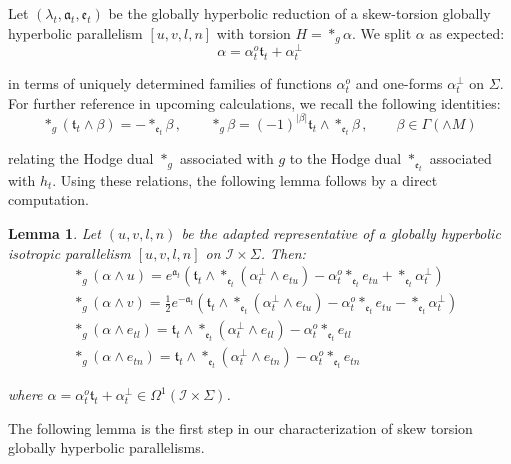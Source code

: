 \documentclass[10pt,reqno,a4paper]{amsart}
\theoremstyle{plain}
\newtheorem{lemma}[thm]{Lemma}
\theoremstyle{definition}
\theoremstyle{remark}
\theoremstyle{remark}
\newcommand{\frt}{\mathfrak{t}}
\def\cI{\mathcal{I}}
\def\fra{\mathfrak{a}}
\def\fre{\mathfrak{e}}
\renewcommand{\(}{ (}
\renewcommand{\)}{ )}
\begin{document}
\noindent
Let $(\lambda_t,\fra_t,\fre_t)$ be the globally hyperbolic reduction of a skew-torsion globally hyperbolic parallelism $[u,v,l,n]$ with torsion $H = \ast_g \alpha$. We split $\alpha$ as expected:
\begin{equation}
\label{eq:splittingxialpha}
\alpha = \alpha_t^o \frt_t +  \alpha^{\perp}_t
\end{equation}

\noindent
in terms of uniquely determined families of functions $\alpha_t^o$ and one-forms $\alpha^{\perp}_t$ on $\Sigma$. For further reference in upcoming calculations, we recall the following identities:
\begin{equation}
\label{eq:hodgehyperbolic}
\ast_g(\frt_t \wedge \beta) = -\ast_{\fre_t}\beta\, , \qquad \ast_{g}\beta = (-1)^{\vert\beta \vert} \frt_t \wedge \ast_{\fre_t} \beta\, , \qquad \beta \in \Gamma(\wedge M) 
\end{equation}

\noindent
relating the Hodge dual $\ast_g$ associated with $g$ to the Hodge dual $\ast_{\fre_t}$ associated with $h_t$. Using these relations, the following lemma follows by a direct computation.


\begin{lemma}
\label{lemma:dualphasplitting}
Let $(u,v,l,n)$ be the adapted representative of a globally hyperbolic
isotropic parallelism $[u,v,l,n]$ on $\cI\times\Sigma$. Then:
\begin{eqnarray*}
& \ast_g(\alpha\wedge u) = e^{\fra_t}  (\frt_t \wedge \ast_{\fre_t}(\alpha^{\perp}_t \wedge e_{tu})  - \alpha^o_t \ast_{\fre_t} e_{tu} + \ast_{\fre_t}\alpha^{\perp}_t) \\
& \ast_g(\alpha\wedge v) = \frac{1}{2} e^{-\fra_t} (\frt_t \wedge \ast_{\fre_t}(\alpha^{\perp}_t \wedge e_{tu})  - \alpha^o_t \ast_{\fre_t} e_{tu} - \ast_{\fre_t}\alpha^{\perp}_t) \\
& \ast_g(\alpha\wedge e_{tl}) =  \frt_t \wedge \ast_{\fre_t}(\alpha^{\perp}_t \wedge e_{tl})  - \alpha^o_t \ast_{\fre_t} e_{tl} \\
& \ast_g(\alpha\wedge e_{tn}) =  \frt_t \wedge \ast_{\fre_t}(\alpha^{\perp}_t \wedge e_{tn})  - \alpha^o_t \ast_{\fre_t} e_{tn} 
\end{eqnarray*}

\noindent
where $\alpha = \alpha^o_t \frt_t + \alpha^{\perp}_t \in \Omega^1(\cI\times \Sigma)$.
\end{lemma}

\noindent
The following lemma is the first step in our characterization of skew torsion globally hyperbolic parallelisms.
\end{document}
